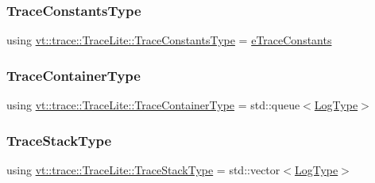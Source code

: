 \mbox{\label{structvt_1_1trace_1_1_trace_lite_a55bd5754c9786ae91a33bcf57f32acc8}} 
\subsubsection{\texorpdfstring{Trace\+Constants\+Type}{TraceConstantsType}}
{\footnotesize\ttfamily using \hyperlink{namespacevt_1_1trace_acf454dfbd581b0ebae895f90b5927a1d}{vt\+::trace\+::\+Trace\+Lite\+::\+Trace\+Constants\+Type} =  \hyperlink{namespacevt_1_1trace_acf454dfbd581b0ebae895f90b5927a1d}{e\+Trace\+Constants}}

\mbox{\label{structvt_1_1trace_1_1_trace_lite_a346a7751a544de425345a8983ed52146}} 
\subsubsection{\texorpdfstring{Trace\+Container\+Type}{TraceContainerType}}
{\footnotesize\ttfamily using \hyperlink{structvt_1_1trace_1_1_trace_lite_a346a7751a544de425345a8983ed52146}{vt\+::trace\+::\+Trace\+Lite\+::\+Trace\+Container\+Type} =  std\+::queue$<$\hyperlink{structvt_1_1trace_1_1_trace_lite_aeb73e523d31829d3163c877b145afa2a}{Log\+Type}$>$}

\mbox{\label{structvt_1_1trace_1_1_trace_lite_ae827dd1c4f37ac2dbcb6f4898a664b99}} 
\subsubsection{\texorpdfstring{Trace\+Stack\+Type}{TraceStackType}}
{\footnotesize\ttfamily using \hyperlink{structvt_1_1trace_1_1_trace_lite_ae827dd1c4f37ac2dbcb6f4898a664b99}{vt\+::trace\+::\+Trace\+Lite\+::\+Trace\+Stack\+Type} =  std\+::vector$<$\hyperlink{structvt_1_1trace_1_1_trace_lite_aeb73e523d31829d3163c877b145afa2a}{Log\+Type}$>$}



